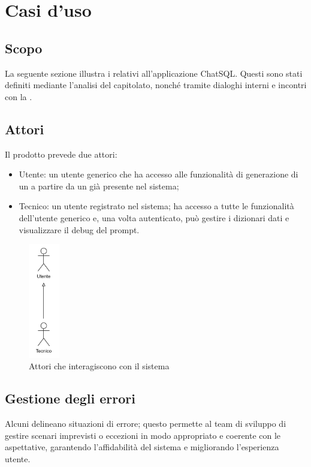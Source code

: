 \section{Casi d'uso}

\subsection{Scopo}
\par La seguente sezione illustra i  relativi all'applicazione ChatSQL. Questi sono stati definiti mediante l'analisi del capitolato, nonché tramite dialoghi interni e incontri con la .

\subsection{Attori}
\par Il prodotto prevede due attori:
\begin{itemize}
  \item Utente: un utente generico che ha accesso alle funzionalità di generazione di un  a partire da un  già presente nel sistema; 
  \item Tecnico: un utente registrato nel sistema; ha accesso a tutte le funzionalità dell'utente generico e, una volta autenticato, può gestire i dizionari dati e visualizzare il debug del prompt.
\end{itemize}

\begin{figure}[H]
  \centering
  \includegraphics[width=0.12\textwidth, height=0.27\textheight]{assets/attori.png}
  \caption{Attori che interagiscono con il sistema}
\end{figure}

\subsection{Gestione degli errori}
\par Alcuni  delineano situazioni di errore; questo permette al team di sviluppo di gestire scenari imprevisti o eccezioni in modo appropriato e coerente con le aspettative, garantendo l'affidabilità del sistema e migliorando l'esperienza utente.

